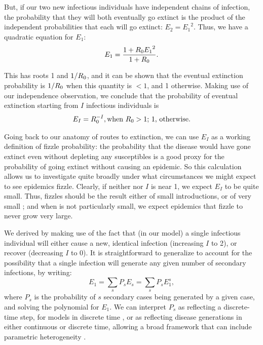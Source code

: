 \documentclass{amsproc}
\theoremstyle{definition}
\theoremstyle{remark}
\numberwithin{equation}{section}
\begin{document}
But, if our two new infectious individuals have independent chains of infection, the probability that they will both eventually go extinct is the product of the independent probabilities that each will go extinct: $E_2 = {E_1}^2$.  Thus, we have a quadratic equation for $E_1$:
\begin{equation}
	E_1 = \frac{1+R_0 {E_1}^2}{1+R_0}.
\end{equation}

This has roots 1 and $1/R_0$, and it can be shown that the eventual extinction probability is $1/R_0$ when this quantity is $<1$, and 1 otherwise.  Making use of our independence observation, we conclude that the probability of eventual extinction starting from $I$ infectious individuals is
\begin{equation}
	E_I = R_0^{-I}, \mbox{when $R_0>1$; $1$, otherwise.}
	\eqlab{fizzle}
\end{equation}

Going back to our anatomy of routes to extinction, we can use $E_I$ as a working definition of fizzle probability: the probability that the disease would have gone extinct even without depleting any susceptibles is a good proxy for the probability of going extinct without causing an epidemic.  So this calculation allows us to investigate quite broadly under what circumstances we might expect to see epidemics fizzle.  Clearly, if neither \Ro nor $I$ is near 1, we expect $E_I$ to be quite small.  Thus, fizzles should be the result either of small introductions, or of very small \Ro; and when \Ro is not particularly small, we expect epidemics that fizzle to never grow very large.

We derived  by making use of the fact that (in our model) a single infectious individual will either cause a new, identical infection (increasing $I$ to 2), or recover (decreasing $I$ to 0).  It is straightforward to generalize  to account for the possibility that a single infection will generate any given number of secondary infections, by writing:
\begin{equation}
	E_1 = \sum_s{P_s E_s} = \sum_s{P_s E_1^s},
\end{equation}
where $P_s$ is the probability of $s$ secondary cases being generated by a given case, and solving the polynomial for $E_1$.
We can interpret $P_s$ as reflecting a discrete-time step, for models in discrete time , or as reflecting disease generations in either continuous or discrete time, allowing a broad framework that can include parametric heterogeneity .
\end{document}
